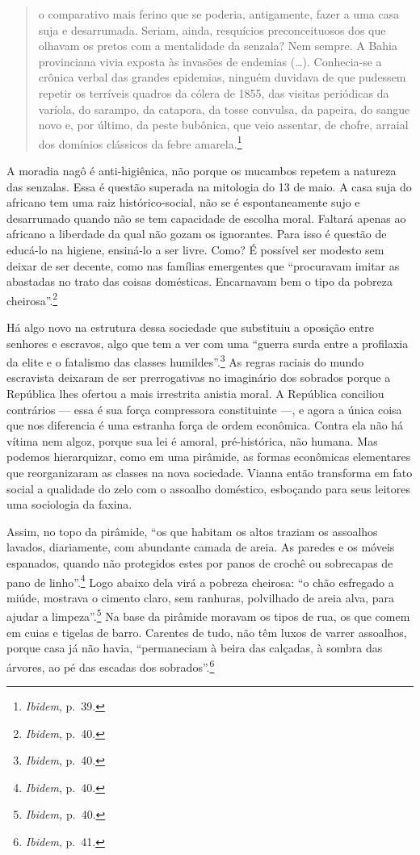 \begin{quote}
o comparativo mais ferino que se poderia, antigamente, fazer a uma casa
suja e desarrumada. Seriam, ainda, resquícios preconceituosos dos que
olhavam os pretos com a mentalidade da senzala? Nem sempre. A Bahia
provinciana vivia exposta às invasões de endemias (\dots{}). Conhecia-se a
crônica verbal das grandes epidemias, ninguém duvidava de que pudessem
repetir os terríveis quadros da cólera de 1855, das visitas periódicas
da varíola, do sarampo, da catapora, da tosse convulsa, da papeira, do
sangue novo e, por último, da peste bubônica, que veio assentar, de
chofre, arraial dos domínios clássicos da febre amarela.\footnote{\textit{Ibidem},
  p.~39.}
\end{quote}

A moradia nagô é anti-higiênica, não porque os mucambos repetem a
natureza das senzalas. Essa é questão superada na mitologia do 13 de
maio. A casa suja do africano tem uma raiz histórico-social, não se é
espontaneamente sujo e desarrumado quando não se tem capacidade de
escolha moral. Faltará apenas ao africano a liberdade da qual não gozam
os ignorantes. Para isso é questão de educá-lo na higiene, ensiná-lo a
ser livre. Como? É possível ser modesto sem deixar de ser decente, como
nas famílias emergentes que ``procuravam imitar as abastadas no trato
das coisas domésticas. Encarnavam bem o tipo da pobreza
cheirosa''.\footnote{\textit{Ibidem}, p.~40.}

Há algo novo na estrutura dessa sociedade que substituiu a oposição
entre senhores e escravos, algo que tem a ver com uma ``guerra surda
entre a profilaxia da elite e o fatalismo das classes
humildes''.\footnote{\textit{Ibidem}, p.~40.} As regras raciais do mundo
escravista deixaram de ser prerrogativas no imaginário dos sobrados
porque a República lhes ofertou a mais irrestrita anistia moral. A
República conciliou contrários --- essa é sua força compressora
constituinte ---, e agora a única coisa que nos diferencia é uma estranha
força de ordem econômica. Contra ela não há vítima nem algoz, porque sua
lei é amoral, pré-histórica, não humana. Mas podemos hierarquizar, como
em uma pirâmide, as formas econômicas elementares que reorganizaram as
classes na nova sociedade. Vianna então transforma em fato social a
qualidade do zelo com o assoalho doméstico, esboçando para seus leitores
uma sociologia da faxina.

Assim, no topo da pirâmide, ``os que habitam os altos traziam os
assoalhos lavados, diariamente, com abundante camada de areia. As
paredes e os móveis espanados, quando não protegidos estes por panos de
crochê ou sobrecapas de pano de linho''.\footnote{\textit{Ibidem}, p.~40.}
Logo abaixo dela virá a pobreza cheirosa: ``o chão esfregado a miúde,
mostrava o cimento claro, sem ranhuras, polvilhado de areia alva, para
ajudar a limpeza''.\footnote{\textit{Ibidem,} p.~40.} Na base da pirâmide
moravam os tipos de rua, os que comem em cuias e tigelas de barro.
Carentes de tudo, não têm luxos de varrer assoalhos, porque casa já não
havia, ``permaneciam à beira das calçadas, à sombra das árvores, ao pé
das escadas dos sobrados''.\footnote{\textit{Ibidem}, p.~41.}

